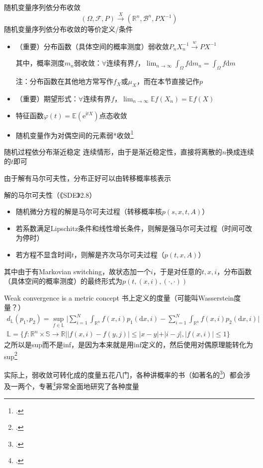 \documentclass[10pt,aspectratio=43]{beamer}
\begin{document}
\begin{frame}{随机变量序列依分布收敛}
\begin{equation*}\label{key}
(\Omega,\mathcal{F},P)\xrightarrow{X}(\mathbb{R}^n,\mathcal{B}^n,PX^{-1})
\end{equation*}
随机变量序列依分布收敛的等价定义/条件
\begin{itemize}
\item （重要）分布函数（具体空间的概率测度）弱收敛$ P_nX_n^{-1}\xrightarrow{w}PX^{-1} $

其中，概率测度$ m_n $弱收敛：$ \forall $连续有界$ f $，$ \lim_{n\to\infty}\int_\Omega f\mathrm{d}m_n=\int_\Omega f\mathrm{d}m $

注：分布函数在其他地方常写作$ f_X $或$ \mu_X $，而在本节直接记作$ p $

\item （重要）期望形式：$ \forall $连续有界$ f $，$ \lim_{n\to\infty}\mathbb{E}f(X_n)=\mathbb{E}f(X) $
\item 特征函数$ \varphi(t)=\mathbb{E}(\mathrm{e}^{\mathrm{i}tX}) $点态收敛
\item 随机变量作为对偶空间的元素弱*收敛\footcite{bobrowski_functional_2005}
\end{itemize}
\end{frame}

\begin{frame}{随机过程依分布渐近稳定}
连续情形，由于是渐近稳定性，直接将离散的$ n $换成连续的$ t $即可

由于解有马尔可夫性，分布正好可以由转移概率核表示
\begin{block}{解的马尔可夫性（《SDE》2.8）}
\begin{itemize}
\item 随机微分方程的解是马尔可夫过程（转移概率核$ p(s,x,t,A) $）
\item 若系数满足Lipschitz条件和线性增长条件，则解是强马尔可夫过程（时间可改为停时）
\item 若方程不显含时间$ t $，则解是齐次马尔可夫过程（$ p(t,x,A) $）
\end{itemize}
\end{block}

其中由于有Markovian switching，故状态加一个$ i $，于是对任意的$ t,x,i $，分布函数（具体空间的概率测度）的最终形式为$ p(t,(x,i),(\cdot,\cdot)) $
\end{frame}
\begin{frame}{Weak convergence is a metric concept}
书上定义的度量（可能叫Wasserstein度量？）
\begin{gather*}
d_{\mathbb{L}}(p_1,p_2)=\sup_{f\in\mathbb{L}}\Biggl|\sum_{i=1}^{N}\int_{\mathbb{R}^n}f(x,i)p_1(\mathrm{d}x,i)-\sum_{i=1}^{N}\int_{\mathbb{R}^n}f(x,i)p_2(\mathrm{d}x,i)\Biggr|\\
\mathbb{L}=\{f:\mathbb{R}^n\times\mathbb{S}\to\mathbb{R}||f(x,i)-f(y,j)|\le|x-y|+|i-j|,|f(x,i)|\le 1\}
\end{gather*}
之所以是sup而不是inf，是因为本来就是用inf定义的，然后使用对偶原理能转化为sup\footcite{noauthor_wasserstein_2017}

实际上，弱收敛可转化成的度量五花八门，各种讲概率的书（如著名的\footcite{durrett_probability_2019}）都会涉及一两个，专著\footcite{rachev_methods_2013}非常全面地研究了各种度量
\end{frame}
\end{document}

